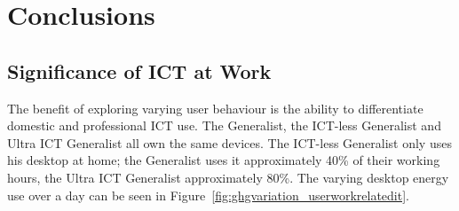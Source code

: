 \documentclass[conference]{IEEEtran}
\begin{document}


\section{Conclusions}





\subsection{Significance of ICT at Work}

The benefit of exploring varying user behaviour is the ability to
differentiate domestic and professional ICT use. The Generalist, the
ICT-less Generalist and Ultra ICT Generalist all own the same
devices. The ICT-less Generalist only uses his desktop at home; the
Generalist uses it approximately 40\% of their working hours, the
Ultra ICT Generalist approximately 80\%. The varying desktop energy use
over a day can be seen in
Figure~\ref{fig:ghgvariation_userworkrelatedit}.
\end{document}
